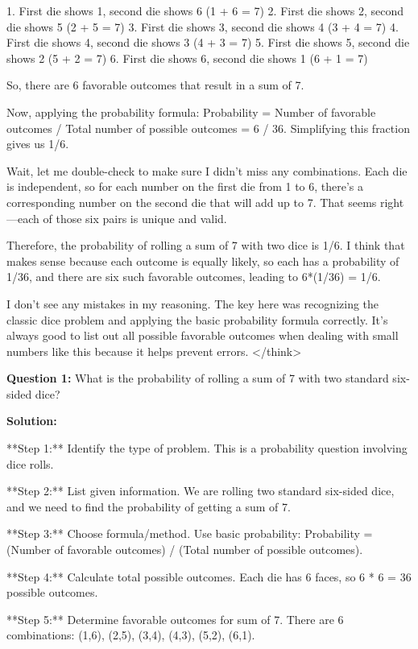 \documentclass[12pt]{article}
\begin{document}
1. First die shows 1, second die shows 6 (1 + 6 = 7)
2. First die shows 2, second die shows 5 (2 + 5 = 7)
3. First die shows 3, second die shows 4 (3 + 4 = 7)
4. First die shows 4, second die shows 3 (4 + 3 = 7)
5. First die shows 5, second die shows 2 (5 + 2 = 7)
6. First die shows 6, second die shows 1 (6 + 1 = 7)

So, there are 6 favorable outcomes that result in a sum of 7.

Now, applying the probability formula: Probability = Number of favorable outcomes / Total number of possible outcomes = 6 / 36. Simplifying this fraction gives us 1/6.

Wait, let me double-check to make sure I didn't miss any combinations. Each die is independent, so for each number on the first die from 1 to 6, there's a corresponding number on the second die that will add up to 7. That seems right—each of those six pairs is unique and valid.

Therefore, the probability of rolling a sum of 7 with two dice is 1/6. I think that makes sense because each outcome is equally likely, so each has a probability of 1/36, and there are six such favorable outcomes, leading to 6*(1/36) = 1/6.

I don't see any mistakes in my reasoning. The key here was recognizing the classic dice problem and applying the basic probability formula correctly. It's always good to list out all possible favorable outcomes when dealing with small numbers like this because it helps prevent errors.
</think>

\textbf{Question 1:} What is the probability of rolling a sum of 7 with two standard six-sided dice?

\textbf{Solution:}

**Step 1:** Identify the type of problem. This is a probability question involving dice rolls.

**Step 2:** List given information. We are rolling two standard six-sided dice, and we need to find the probability of getting a sum of 7.

**Step 3:** Choose formula/method. Use basic probability: Probability = (Number of favorable outcomes) / (Total number of possible outcomes).

**Step 4:** Calculate total possible outcomes. Each die has 6 faces, so 6 * 6 = 36 possible outcomes.

**Step 5:** Determine favorable outcomes for sum of 7. There are 6 combinations: (1,6), (2,5), (3,4), (4,3), (5,2), (6,1).
\end{document}
